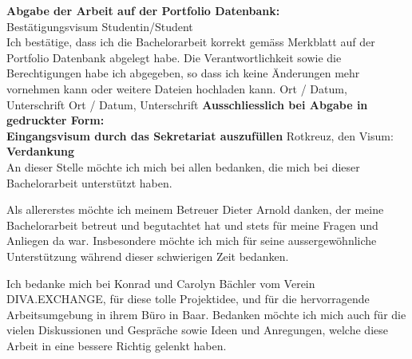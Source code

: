 \newpage
\noindent
\textbf{Abgabe der Arbeit auf der Portfolio Datenbank:}\\
Best\"atigungsvisum Studentin/Student\\
Ich best\"atige, dass ich die Bachelorarbeit korrekt gem\"ass Merkblatt auf der Portfolio Datenbank abgelegt habe. Die Verantwortlichkeit sowie die Berechtigungen habe ich abgegeben, so dass ich keine \"Anderungen mehr vornehmen kann oder weitere Dateien hochladen kann. \newline \newline
Ort / Datum, Unterschrift       \underline{\hspace*{4cm}} \newline \newline
Ort / Datum, Unterschrift   \underline{\hspace*{4cm}} \newline \newline \newline
\noindent
{\textbf{Ausschliesslich bei Abgabe in gedruckter Form: \\
Eingangsvisum durch das Sekretariat auszuf\"ullen}} \newline \newline
Rotkreuz, den   \underline{\hspace*{4cm}} \hspace*{1cm} Visum:  \underline{\hspace*{4cm}} 
\newline \newline \newline
\textbf{Verdankung}\\
An dieser Stelle möchte ich mich bei allen bedanken, die mich bei dieser Bachelorarbeit unterstützt haben.

Als allererstes möchte ich meinem Betreuer Dieter Arnold danken, der meine Bachelorarbeit betreut und begutachtet hat und stets für meine Fragen und Anliegen da war. Insbesondere möchte ich mich für seine aussergewöhnliche Unterstützung während dieser schwierigen Zeit bedanken.

Ich bedanke mich bei Konrad und Carolyn Bächler vom Verein DIVA.EXCHANGE, für diese tolle Projektidee, und für die hervorragende Arbeitsumgebung in ihrem Büro in Baar. Bedanken möchte ich mich auch für die vielen Diskussionen und Gespräche sowie Ideen und Anregungen, welche diese Arbeit in eine bessere Richtig gelenkt haben.

